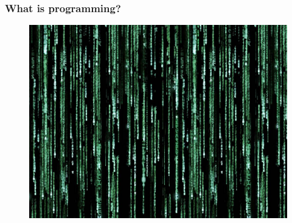 \documentclass{beamer}
\begin{document}
\begin{frame}
\frametitle{What is programming?}
\centering \huge 

\begin{figure}
\includegraphics[scale=0.28]{hack.jpg}
\end{figure}
% 
% 
% 
% 

% 

\end{frame}
\end{document}
